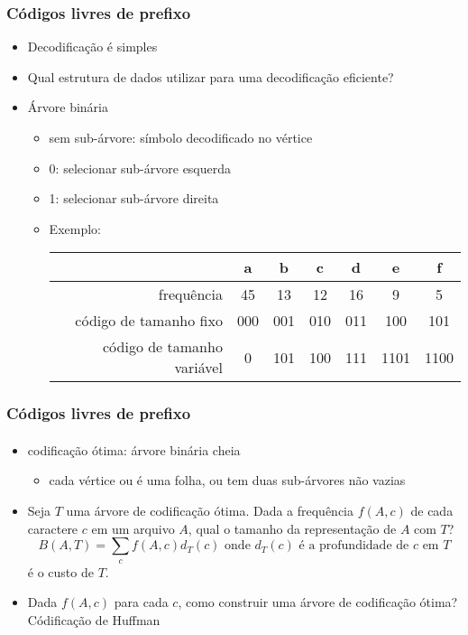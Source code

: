 \documentclass{beamer}
\begin{document}

\begin{frame}
\frametitle{Códigos livres de prefixo}

\begin{itemize}
\item Decodificação é simples
\item Qual estrutura de dados utilizar para uma decodificação eficiente?
\pause
\item Árvore binária
\begin{itemize}
\item sem sub-árvore: símbolo decodificado no vértice
\item 0: selecionar sub-árvore esquerda
\item 1: selecionar sub-árvore direita
\item Exemplo:
\begin{center}
\begin{tabular}{r|c|c|c|c|c|c|}
& a & b & c & d & e & f \\
\hline
frequência & 45 & 13 & 12 & 16 & 9 & 5 \\
código de tamanho fixo & 000 & 001 & 010 & 011 & 100 & 101 \\
código de tamanho variável & 0 & 101 & 100 & 111 & 1101 & 1100
\end{tabular}
\end{center}
\end{itemize}
\end{itemize}
\end{frame}


\begin{frame}
\frametitle{Códigos livres de prefixo}
\framesubtitle{}
\begin{itemize}
\item codificação ótima: árvore binária cheia
\begin{itemize}
\item cada vértice ou é uma folha, ou tem duas sub-árvores não vazias
\end{itemize}
\item Seja $T$ uma árvore de codificação ótima. Dada a frequência $f(A, c)$ de cada
  caractere $c$ em um arquivo $A$, qual o tamanho da representação de $A$ com
  $T$?  \pause
$$ B(A, T) = \sum_{c} f(A, c) d_T(c) \text{ onde $d_T(c)$ é a profundidade de
    $c$ em $T$} $$
é o \alert{custo} de $T$.
\pause
\item Dada $f(A, c)$ para cada $c$, como construir uma árvore de codificação ótima? \pause \alert{Códificação de Huffman}

\end{itemize}
\end{frame}
\end{document}
